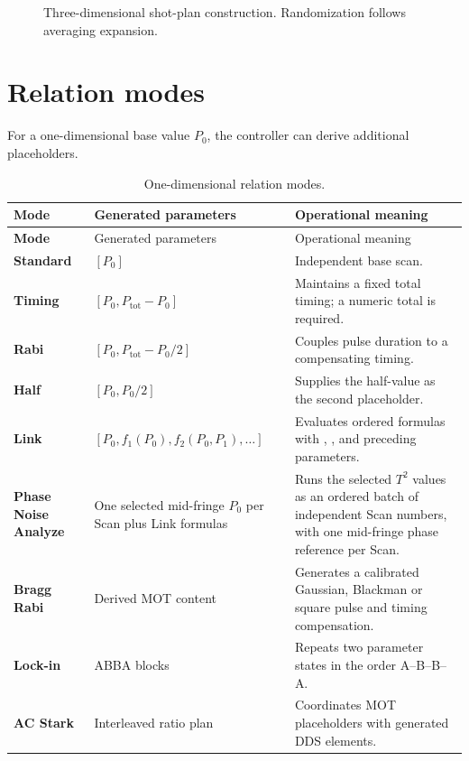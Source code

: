 \documentclass[11pt,oneside,openany]{book}
\newcommand{\code}[1]{\texttt{\detokenize{#1}}}
\begin{document}
\begin{figure}[htbp]
\centering
{}
\caption{Three-dimensional shot-plan construction. Randomization follows averaging
expansion.}
\label{fig:scan-plan}
\end{figure}

\section{Relation modes}
For a one-dimensional base value $P_0$, the controller can derive additional placeholders.
\begin{longtable}{>{\bfseries}l l p{}}
\caption{One-dimensional relation modes.}\label{tab:modes}\\
\toprule
Mode & Generated parameters & Operational meaning\\
\midrule
\endfirsthead
\toprule
Mode & Generated parameters & Operational meaning\\
\midrule
\endhead
Standard & $[P_0]$ & Independent base scan.\\
Timing & $[P_0,P_{\mathrm{tot}}-P_0]$ & Maintains a fixed total timing; a numeric total is required.\\
Rabi & $[P_0,P_{\mathrm{tot}}-P_0/2]$ & Couples pulse duration to a compensating timing.\\
Half & $[P_0,P_0/2]$ & Supplies the half-value as the second placeholder.\\
Link & $[P_0,f_1(P_0),f_2(P_0,P_1),\ldots]$ & Evaluates ordered formulas with \code{math}, \code{numpy}, and preceding parameters.\\
Phase Noise Analyze & One selected mid-fringe $P_0$ per Scan plus Link formulas & Runs the selected $T^2$ values as an ordered batch of independent Scan numbers, with one mid-fringe phase reference per Scan.\\
Bragg Rabi & Derived MOT content & Generates a calibrated Gaussian, Blackman or square pulse and timing compensation.\\
Lock-in & ABBA blocks & Repeats two parameter states in the order A--B--B--A.\\
AC Stark & Interleaved ratio plan & Coordinates MOT placeholders with generated DDS elements.\\
\bottomrule
\end{longtable}
\end{document}
